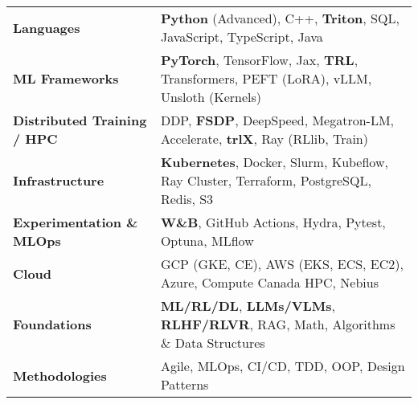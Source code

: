 \begin{tabularx}{\textwidth}{@{} >{\bfseries}l L @{}}
Languages &
  \textbf{Python} (Advanced), C++, \textbf{Triton}, SQL, JavaScript, TypeScript, Java \\[2pt]
ML Frameworks &
  \textbf{PyTorch}, TensorFlow, Jax, \textbf{TRL}, Transformers, PEFT (LoRA), vLLM, Unsloth (Kernels) \\
Distributed Training / HPC &
  DDP, \textbf{FSDP}, DeepSpeed, Megatron-LM, Accelerate, \textbf{trlX}, Ray (RLlib, Train) \\[2pt]
Infrastructure &
  \textbf{Kubernetes}, Docker, Slurm, Kubeflow, Ray Cluster, Terraform, PostgreSQL, Redis, S3 \\[2pt]
Experimentation \& MLOps &
  \textbf{W\&B}, GitHub Actions, Hydra, Pytest, Optuna, MLflow \\[2pt]
Cloud &
  GCP (GKE, CE), AWS (EKS, ECS, EC2), Azure, Compute Canada HPC, Nebius \\[2pt]
Foundations &
     \textbf{ML/RL/DL}, \textbf{LLMs/VLMs}, \textbf{RLHF/RLVR}, RAG, Math, Algorithms \& Data Structures \\
Methodologies &
  Agile, MLOps, CI/CD, TDD, OOP, Design Patterns \\[2pt]
\end{tabularx}






